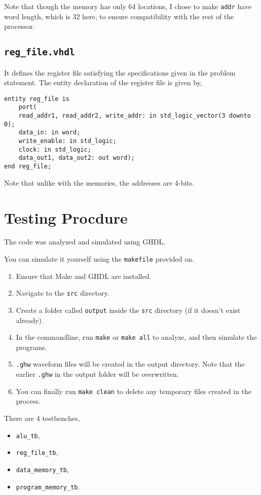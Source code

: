 \documentclass[a4paper]{scrartcl}
\renewcommand{\tt}{\texttt}
\begin{document}
Note that though the memory has only 64 locations, I chose to make \tt{addr} have word length, which is 32 here, to ensure compatibility with the rest of the processor.

\subsection*{\tt{reg_file.vhdl}}
It defines the register file satisfying the specifications given in the problem statement.
The entity declaration of the register file is given by,
\begin{verbatim}
entity reg_file is
	port(
	read_addr1, read_addr2, write_addr: in std_logic_vector(3 downto 0);
	data_in: in word;
	write_enable: in std_logic;
	clock: in std_logic;
	data_out1, data_out2: out word);
end reg_file;
\end{verbatim}
Note that unlike with the memories, the addresses are 4-bits.

\section{Testing Procdure}
The code was analyzed and simulated using GHDL.

You can simulate it yourself using the \tt{makefile} provided on.
\begin{enumerate}
	\item Ensure that Make and GHDL are installed.
	\item Navigate to the \tt{src} directory.
	\item Create a folder called \tt{output} inside the \tt{src} directory (if it doesn't exist already).
	\item In the commandline, run \tt{make} or \tt{make all} to analyze, and then simulate the programs.
	\item \tt{.ghw} waveform files will be created in the output directory. Note that the earlier \tt{.ghw} in the output folder will be overwritten.
	\item You can finally run \tt{make clean} to delete any temporary files created in the process.
\end{enumerate}

There are 4 testbenches,
\begin{multicols}{2}
	\begin{itemize}
		\item \tt{alu_tb},
		\item \tt{reg_file_tb},
		\item \tt{data_memory_tb},
		\item \tt{program_memory_tb}.
	\end{itemize}
\end{multicols}
\end{document}
